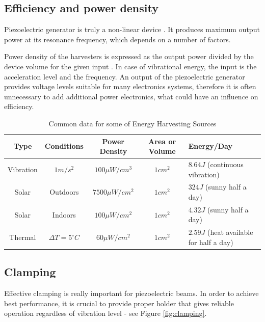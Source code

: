 \documentclass[12pt,a4paper]{article}
\begin{document}
\subsection{Efficiency and power density}
Piezoelectric generator is truly a non-linear device \cite{EnHv2}. It produces maximum output power at its resonance frequency, which depends on a number of factors. 
\par
Power density of the harvesters is expressed as the output power divided by the device volume for the given input \cite{EnHv2}. In case of vibrational energy, the input is the acceleration level and the frequency. An output of the piezoelectric generator provides voltage levels suitable for many electronics systems, therefore it is often unnecessary to add additional power electronics, what could have an influence on efficiency.
\par
\begin{table}[ht!]
\small
\begin{center} 
\begin{tabular}{|c|c|c|c|l|}
\hline 
\textbf{Type} & \textbf{Conditions} & \textbf{Power Density} & \textbf{Area or Volume} & \textbf{Energy/Day} \\ 
\hline 
\hline
Vibration & $1m/s^2$ & $100\mu W/cm^3$ & $1cm^2$ & $8.64J$ (continuous vibration) \\ 
\hline 
Solar & Outdoors & $7500\mu W/cm^2$ & $1cm^2$ & $324J$ (sunny half a day) \\ 
\hline 
Solar & Indoors & $100\mu W/cm^2$ & $1cm^2$ & $4.32J$ (sunny half a day) \\ 
\hline 
Thermal & $\Delta T = 5 ^{\circ} C$ & $60\mu W/cm^2$ & $1cm^2$ & $2.59J$ (heat available for half a day) \\ 
\hline 
\end{tabular} 
\end{center}
\caption{Common data for some of Energy Harvesting Sources \cite{EnHv1}}
\label{tab:typdat}
\end{table}
\par

\subsection{Clamping}
Effective clamping is really important for piezoelectric beams. In order to achieve best performance, it is crucial to provide proper holder that gives reliable operation regardless of vibration level - see Figure \ref{fig:clamping}.\par
\end{document}
